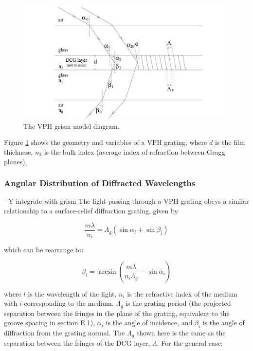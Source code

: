\begin{figure}[H]
\centering
\includegraphics[width=\textwidth]{figures/VPH-grating-model.pdf}
\caption{The VPH grism model diagram.}
\label{fig:VPH-grating-model}
\end{figure}

Figure \ref{fig:VPH-grating-model} shows the geometry and variables of a VPH grating, where $d$ is the film thickness, $n_2$ is the bulk index (average index of refraction between Gragg planes). 

\subsubsection{Angular Distribution of Diffracted Wavelengths} - Y integrate with grism
The light passing through a VPH grating obeys a similar relationship to a surface-relief diffraction grating, given by

\begin{equation}
\frac{m\lambda}{n_i} = \Lambda_g(\sin\alpha_i + \sin\beta_i)
\end{equation}

which can be rearrange to:

\begin{equation}
\beta_i = \arcsin\left(\frac{m\lambda}{n_i\Lambda_g} - \sin\alpha_i \right)
\end{equation}

where $l$ is the wavelength of the light, $n_i$ is the refractive index of the medium with $i$ corresponding to the medium. $\Lambda_g$ is the grating period (the projected separation between the fringes in the plane of the grating, equivalent to the groove spacing in section E.1), $\alpha_i$ is the angle of incidence, and $\beta_i$ is the angle of diffraction from the grating normal. The $\Lambda_g$ shown here is the same as the separation between the fringes of the DCG layer, $\Lambda$. For the general case:

